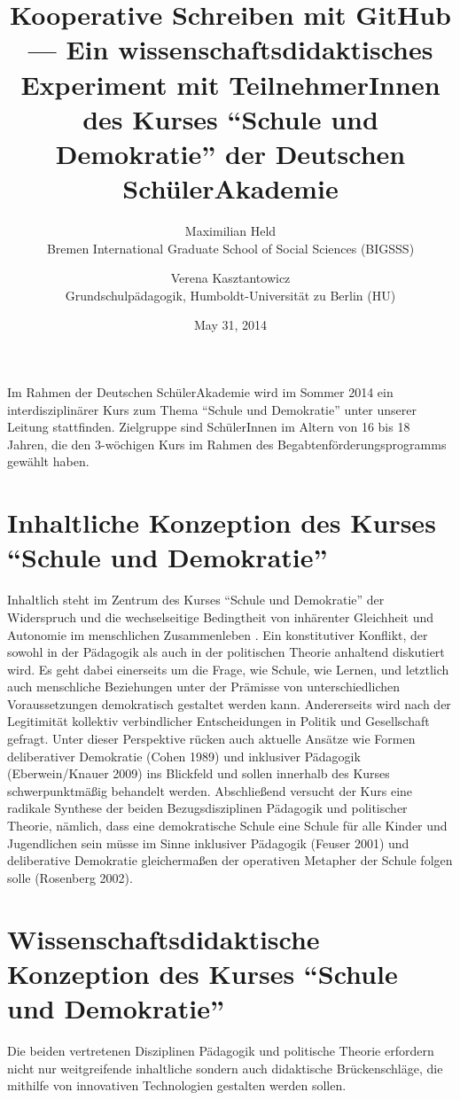 \documentclass[11pt,a4paper,oneside]{article}
\title{
	Kooperative Schreiben mit GitHub ---
	Ein wissenschaftsdidaktisches Experiment mit TeilnehmerInnen des Kurses ``Schule und Demokratie'' der Deutschen SchülerAkademie
}
\date{May 31, 2014}
\author{
	Maximilian Held\\
	Bremen International Graduate School of Social Sciences (BIGSSS)
	\and
	Verena Kasztantowicz\\
	Grundschulpädagogik, Humboldt-Universität zu Berlin (HU)
}
\begin{document}

\maketitle

Im Rahmen der Deutschen SchülerAkademie wird im Sommer 2014 ein interdisziplinärer Kurs zum Thema ``Schule und Demokratie'' unter unserer Leitung stattfinden.
Zielgruppe sind SchülerInnen im Altern von 16 bis 18 Jahren, die den 3-wöchigen Kurs im Rahmen des Begabtenförderungsprogramms gewählt haben.

\section{Inhaltliche Konzeption des Kurses ``Schule und Demokratie''}

Inhaltlich steht im Zentrum des Kurses ``Schule und Demokratie'' der Widerspruch und die wechselseitige Bedingtheit von inhärenter Gleichheit und Autonomie im menschlichen Zusammenleben \cite{Habermas1999a}.
Ein konstitutiver Konflikt, der sowohl in der Pädagogik als auch in der politischen Theorie anhaltend diskutiert wird.
Es geht dabei einerseits um die Frage, wie Schule, wie Lernen, und letztlich auch menschliche Beziehungen unter der Prämisse von unterschiedlichen Voraussetzungen demokratisch gestaltet werden kann.
Andererseits wird nach der Legitimität kollektiv verbindlicher Entscheidungen in Politik und Gesellschaft gefragt.
Unter dieser Perspektive rücken auch aktuelle Ansätze wie Formen deliberativer Demokratie (Cohen 1989) und inklusiver Pädagogik (Eberwein/Knauer 2009) ins Blickfeld und sollen innerhalb des Kurses schwerpunktmäßig behandelt werden.
Abschließend versucht der Kurs eine radikale Synthese der beiden Bezugsdisziplinen Pädagogik und politischer Theorie, nämlich, dass eine demokratische Schule eine Schule für alle Kinder und Jugendlichen sein müsse im Sinne inklusiver Pädagogik (Feuser 2001) und deliberative Demokratie gleichermaßen der operativen Metapher der Schule folgen solle (Rosenberg 2002).

\section{Wissenschaftsdidaktische Konzeption des Kurses ``Schule und Demokratie''}

Die beiden vertretenen Disziplinen Pädagogik und politische Theorie erfordern nicht nur weitgreifende inhaltliche sondern auch didaktische Brückenschläge, die mithilfe von innovativen Technologien gestalten werden sollen.
\end{document}
